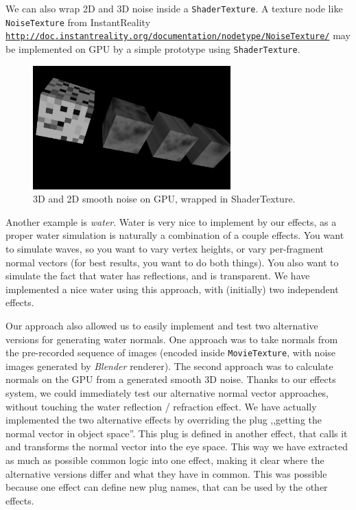 \documentclass{acmsiggraph}                     %
\newcommand*{\myhref}[2]{\texttt{\href{#1}{\nolinkurl{#2}}}}
\begin{document}
We can also wrap 2D and 3D noise inside a \texttt{ShaderTexture}.
A texture node like \texttt{NoiseTexture} from InstantReality
\myhref{http://doc.instantreality.org/documentation/nodetype/NoiseTexture/}{http://doc.instantreality.org/documentation/nodetype/NoiseTexture/}
may be implemented on GPU by a simple prototype using \texttt{ShaderTexture}.

\begin{figure}[H]
  \centering
  \includegraphics[width=3in]{noise}
  \caption{3D and 2D smooth noise on GPU, wrapped in ShaderTexture.}
\end{figure}

Another example is \emph{water}. Water is very nice to implement by our effects,
as a proper water simulation
is naturally a combination of a couple effects.
You want to simulate waves, so you want to vary vertex
heights, or vary per-fragment normal vectors (for best results,
you want to do both things).
You also want to simulate the fact that water has reflections, and
is transparent. We have implemented a nice water using this approach,
with (initially) two independent effects.

Our approach also allowed us to easily implement and test
two alternative versions for generating water normals.
One approach was to take normals from the pre-recorded sequence of images
(encoded inside \texttt{MovieTexture},
with noise images generated by \emph{Blender} renderer).
The second approach was to calculate normals on the GPU from
a generated smooth 3D noise. Thanks to our effects system,
we could immediately test our alternative normal vector approaches,
without touching the water reflection / refraction effect.
We have actually implemented the two alternative effects by overriding
the plug ,,getting the normal vector in object space''.
This plug is defined in another effect, that calls it and transforms
the normal vector into the eye space. This way we have extracted
as much as possible common logic into one effect, making it clear
where the alternative versions differ and what they have in common.
This was possible because one effect can define
new plug names, that can be used by the other effects.
\end{document}
